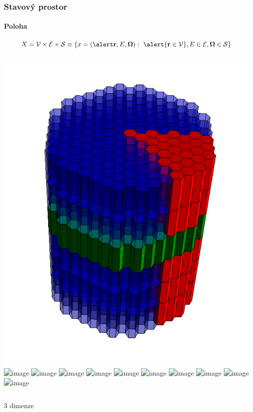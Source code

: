 \begin{frame}[t]
  \frametitle{Stavový prostor}
  \framesubtitle{Poloha}
 
  $$
    X = \VV \times \EE \times \SS \equiv \{x = (\alert\br,E,\bomega):\ \alert{\br\in \VV}, E \in \EE, \bomega\in \SS\}
  $$
  
  \begin{columns}
    \centering\includegraphics[scale=0.225]{obr/core.png}
    \includegraphics<1>[scale=0.425]{obr/core/core_level1}
	  \includegraphics<2>[scale=0.425]{obr/core/core_level2}
	  \includegraphics<3>[scale=0.425]{obr/core/core_level3}
	  \includegraphics<4>[scale=0.425]{obr/core/core_level4}
	  \includegraphics<5>[scale=0.425]{obr/core/core_level5}
	  \includegraphics<6>[scale=0.425]{obr/core/core_level6}
	  \includegraphics<7>[scale=0.425]{obr/core/core_level7}
	  \includegraphics<8>[scale=0.425]{obr/core/core_level8}
	  \includegraphics<9>[scale=0.425]{obr/core/core_level9}
	  \includegraphics<10>[scale=0.425]{obr/core/core_level10}
	  \transduration<1-9>{0.5}
  \end{columns}
  \hfill\alert{3 dimenze}\hfill\hbox{}
\end{frame}


